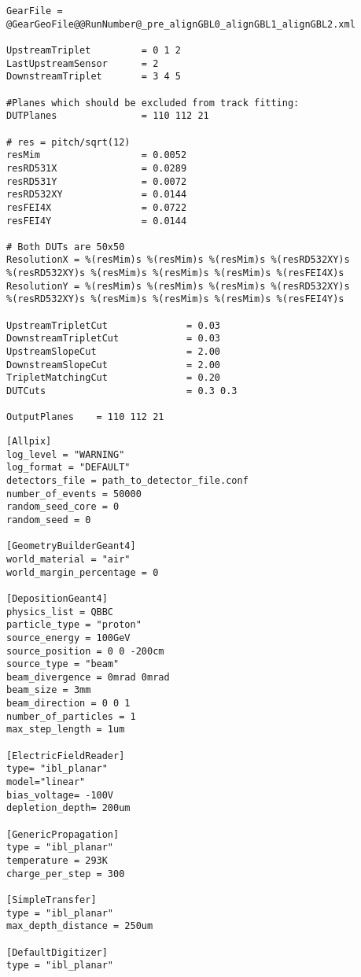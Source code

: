 \begin{lstlisting}[caption={Configuration file of EUTelescope for the testbeam anaylsis of June 2020 Batch 3}]
GearFile = @GearGeoFile@@RunNumber@_pre_alignGBL0_alignGBL1_alignGBL2.xml

UpstreamTriplet         = 0 1 2
LastUpstreamSensor      = 2
DownstreamTriplet       = 3 4 5

#Planes which should be excluded from track fitting:
DUTPlanes               = 110 112 21

# res = pitch/sqrt(12)
resMim                  = 0.0052
resRD531X               = 0.0289
resRD531Y               = 0.0072
resRD532XY              = 0.0144
resFEI4X                = 0.0722
resFEI4Y                = 0.0144

# Both DUTs are 50x50
ResolutionX = %(resMim)s %(resMim)s %(resMim)s %(resRD532XY)s
%(resRD532XY)s %(resMim)s %(resMim)s %(resMim)s %(resFEI4X)s
ResolutionY = %(resMim)s %(resMim)s %(resMim)s %(resRD532XY)s
%(resRD532XY)s %(resMim)s %(resMim)s %(resMim)s %(resFEI4Y)s

UpstreamTripletCut              = 0.03
DownstreamTripletCut            = 0.03
UpstreamSlopeCut                = 2.00
DownstreamSlopeCut              = 2.00
TripletMatchingCut              = 0.20
DUTCuts                         = 0.3 0.3

OutputPlanes    = 110 112 21
\end{lstlisting}

\clearpage

\begin{lstlisting}[caption={Allpix$^2$ simulation for 50000 protons with an energy of $\SI{100}{\giga\eV}$}]
[Allpix]
log_level = "WARNING"
log_format = "DEFAULT"
detectors_file = path_to_detector_file.conf
number_of_events = 50000
random_seed_core = 0
random_seed = 0

[GeometryBuilderGeant4]
world_material = "air"
world_margin_percentage = 0

[DepositionGeant4]
physics_list = QBBC
particle_type = "proton"
source_energy = 100GeV
source_position = 0 0 -200cm
source_type = "beam"
beam_divergence = 0mrad 0mrad
beam_size = 3mm
beam_direction = 0 0 1
number_of_particles = 1
max_step_length = 1um

[ElectricFieldReader]
type= "ibl_planar"
model="linear"
bias_voltage= -100V
depletion_depth= 200um

[GenericPropagation]
type = "ibl_planar"
temperature = 293K
charge_per_step = 300

[SimpleTransfer]
type = "ibl_planar"
max_depth_distance = 250um

[DefaultDigitizer]
type = "ibl_planar"
\end{lstlisting}

